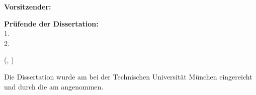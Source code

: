 \begin{titlepage}
\begin{textblock*}{}
        \textbf{Vorsitzender:}\\
        \hspace{8mm}\hphantom{1. } \chairman{}

        \vspace{2mm}

        \textbf{Pr\"ufende der Dissertation:}\\
        \hspace{8mm}1. \supervisorA{}\\
        \vspace{0.4cm}
        \hspace{8mm}2. \supervisorB{}\\
        \vspace{1.0cm}
%


    \end{textblock*}



    \begin{textblock*}{}(, \datevpos)
        \raggedright

        Die Dissertation wurde am \subdate{} bei der Technischen Universit\"at
        M\"unchen eingereicht und durch die {\facultyger{}}
          am \accdate{}
        angenommen.

    \end{textblock*}

\end{titlepage}

\mbox{}
\newpage
\thispagestyle{empty}
\mbox{}
\newpage

\thispagestyle{empty}

%
%

